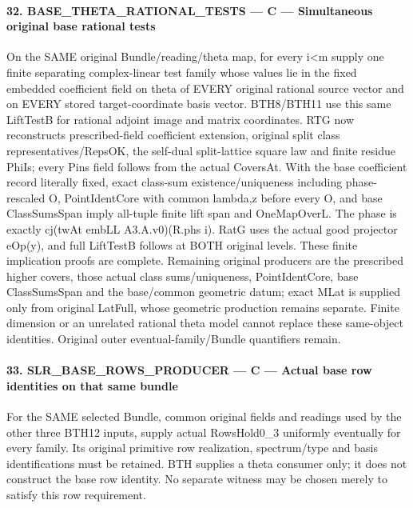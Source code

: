 \paragraph{32. BASE\_\allowbreak{}THETA\_\allowbreak{}RATIONAL\_\allowbreak{}TESTS — C — Simultaneous original base rational tests}

On the SAME original Bundle/\allowbreak{}reading/\allowbreak{}theta map, for every i<m supply one finite separating complex-linear test family whose values lie in the fixed embedded coefficient field on theta of EVERY original rational source vector and on EVERY stored target-coordinate basis vector. BTH8/\allowbreak{}BTH11 use this same LiftTestB for rational adjoint image and matrix coordinates. RTG now reconstructs prescribed-field coefficient extension, original split class representatives/\allowbreak{}RepsOK, the self-dual split-lattice square law and finite residue PhiIs; every Pins field follows from the actual CoversAt. With the base coefficient record literally fixed, exact class-sum existence/\allowbreak{}uniqueness including phase-rescaled O, PointIdentCore with common lambda,z before every O, and base ClassSumsSpan imply all-tuple finite lift span and OneMapOverL. The phase is exactly cj(twAt embLL A3.A.v0)(R.phs i). RatG uses the actual good projector eOp(y), and full LiftTestB follows at BOTH original levels. These finite implication proofs are complete. Remaining original producers are the prescribed higher covers, those actual class sums/\allowbreak{}uniqueness, PointIdentCore, base ClassSumsSpan and the base/\allowbreak{}common geometric datum; exact MLat is supplied only from original LatFull, whose geometric production remains separate. Finite dimension or an unrelated rational theta model cannot replace these same-object identities. Original outer eventual-family/\allowbreak{}Bundle quantifiers remain.

\paragraph{33. SLR\_\allowbreak{}BASE\_\allowbreak{}ROWS\_\allowbreak{}PRODUCER — C — Actual base row identities on that same bundle}

For the SAME selected Bundle, common original fields and readings used by the other three BTH12 inputs, supply actual RowsHold0\_\allowbreak{}3 uniformly eventually for every family. Its original primitive row realization, spectrum/\allowbreak{}type and basis identifications must be retained. BTH supplies a theta consumer only; it does not construct the base row identity. No separate witness may be chosen merely to satisfy this row requirement.

